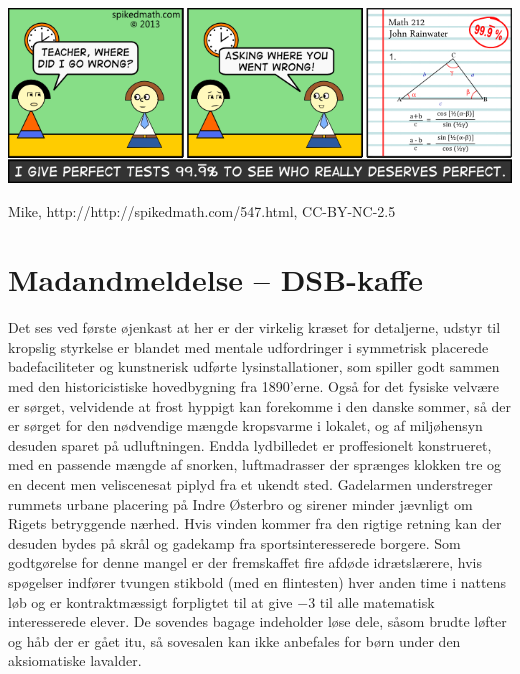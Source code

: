 \documentclass[article,10pt,a4,oneside]{memoir}
\begin{document}
\begin{minipage}[b]{1.95\textwidth}
\begin{minipage}[t]{0.73\linewidth}
\begin{minipage}[t]{0.64\linewidth}
\includegraphics[width=\linewidth]{547-the-perfect-score.png}
\begin{center}
\tiny Mike, http://http://spikedmath.com/547.html, CC-BY-NC-2.5
\end{center}

\end{minipage}
\hfill
\begin{minipage}[t]{0.32\linewidth}
\vspace{3mm}
\section*{Madandmeldelse -- DSB-kaffe}
Det ses ved første øjenkast at her er der virkelig kræset for detaljerne, udstyr til kropslig styrkelse er blandet med mentale udfordringer i symmetrisk placerede badefaciliteter og kunstnerisk udførte lysinstallationer, som spiller godt sammen med den historicistiske hovedbygning fra 1890'erne. Også for det fysiske velvære er sørget, velvidende at frost hyppigt kan forekomme i den danske sommer, så der er sørget for den nødvendige mængde kropsvarme i lokalet, og af miljøhensyn desuden sparet på udluftningen.
Endda lydbilledet er proffesionelt konstrueret, med en passende mængde af snorken, luftmadrasser der sprænges klokken tre og en decent men veliscenesat piplyd fra et ukendt sted. Gadelarmen understreger rummets urbane placering på Indre Østerbro og sirener minder jævnligt om Rigets betryggende nærhed. Hvis vinden kommer fra den rigtige retning kan der desuden bydes på skrål og gadekamp fra sportsinteresserede borgere. Som godtgørelse for denne mangel er der fremskaffet fire afdøde idrætslærere, hvis spøgelser indfører tvungen stikbold (med en flintesten) hver anden time i nattens løb og er kontraktmæssigt forpligtet til at give $-3$ til alle matematisk interesserede elever. 
De sovendes bagage indeholder løse dele, såsom brudte løfter og håb der er gået itu, så sovesalen kan ikke anbefales for børn under den aksiomatiske lavalder.

\end{minipage}
\end{minipage}
\end{minipage}
\end{document}
